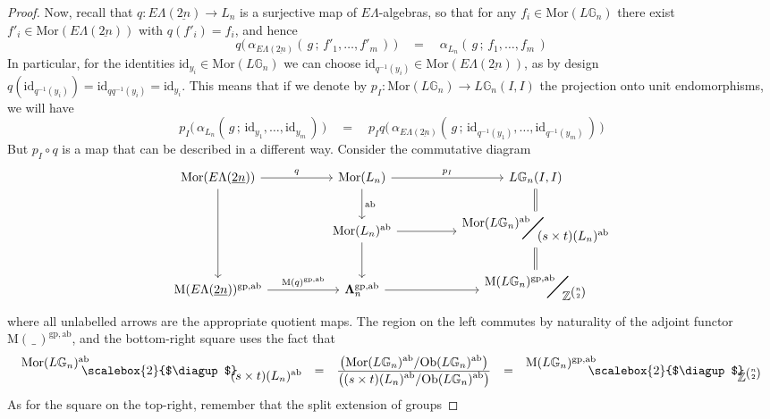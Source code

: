 \documentclass{amsbook} %
\newcommand{\id}{\textrm{id}}
\newcommand{\MLn}{\mathbf{\Lambda}_n}
\newcommand{\MorLn}{\mathrm{Mor}(L_n)}
\newcommand{\bigquotient}[2]{ \raisebox{0.75\height}{$#1$} \mkern-12mu\scalebox{2}{$\diagup$}\mkern-10mu \raisebox{-0.5\height}{$#2$} }
\newcommand{\ELnn}{E\Lambda(\underline{2n})}
\numberwithin{section}{chapter}
\begin{document}
\begin{proof}
Now, recall that $q \colon  \ELnn \to L_n$ is a surjective map of $E\Lambda$-algebras, so that for any $f_i \in \mathrm{Mor}(L\mathbb{G}_{n})$ there exist $f'_i \in \mathrm{Mor}(\ELnn)$ with $q(f'_i) = f_i$, and hence
\[ q\big( \, \alpha_{\ELnn}( \, g \, ; \, f'_1, \ldots, f'_m \, ) \, \big) \quad = \quad \alpha_{L_n}( \, g \, ; \, f_1, \ldots, f_m \, ) \]
In particular, for the identities $\id_{y_i} \in \mathrm{Mor}(L\mathbb{G}_{n})$ we can choose $\id_{q^{-1}(y_i)} \in \mathrm{Mor}(\ELnn)$, as by design $q(\id_{q^{-1}(y_i)}) = \id_{qq^{-1}(y_i)} = \id_{y_i}$. This means that if we denote by $p_I \colon  \mathrm{Mor}(L\mathbb{G}_{n}) \to L\mathbb{G}_{n}(I,I)$ the projection onto unit endomorphisms, we will have
\[ p_I \big( \, \alpha_{L_n}( \, g \, ; \, \id_{y_1}, \ldots, \id_{y_m} \, ) \, \big) \quad = \quad  p_I q\big( \, \alpha_{\ELnn}( \, g \, ; \, \id_{q^{-1}(y_1)}, \ldots, \id_{q^{-1}(y_m)} \, ) \, \big) \]
But $p_I \circ q$ is a map that can be described in a different way. Consider the commutative diagram
\[ \begin{tikzcd}
\mathrm{Mor}(\ELnn) \ar[rr, "q"] \ar[dd] & & \MorLn \ar[d, "\mathrm{ab}"] \ar[rr, "p_I"] & &  L\mathbb{G}_{n}(I,I) \ar[d, equals] \\
& & \MorLn^{\mathrm{ab}} \ar[d] \ar[rr] & & \bigquotient{\mathrm{Mor}(L\mathbb{G}_{n})^{\mathrm{ab}}}{(s \times t)(L_n)^{\mathrm{ab}}} \ar[d, equals] \\
\mathrm{M}(\ELnn)^{\mathrm{gp},\mathrm{ab}} \ar[rr, "\mathrm{M}(q)^{\mathrm{gp},\mathrm{ab}}"] & & \MLn^{\mathrm{gp},\mathrm{ab}} \ar[rr] & & \bigquotient{\mathrm{M}(L\mathbb{G}_{n})^{\mathrm{gp}, \mathrm{ab}}}{\mathbb{Z}^{{n}\choose{2}}}
\end{tikzcd} \]
where all unlabelled arrows are the appropriate quotient maps. The region on the left commutes by naturality of the adjoint functor $\mathrm{M}(\, \_ \,)^{\mathrm{gp},\mathrm{ab}}$, and the bottom-right square uses the fact that
\[ \begin{array}{rllll}
			\bigquotient{\mathrm{Mor}(L\mathbb{G}_{n})^{\mathrm{ab}}}{(s \times t)(L_n)^{\mathrm{ab}}} & = & \frac{ \displaystyle  \left(\mathrm{Mor}(L\mathbb{G}_{n})^{\mathrm{ab}}/\mathrm{Ob}(L\mathbb{G}_{n})^{\mathrm{ab}} \right)}{ \displaystyle \left( (s \times t)(L_n)^{\mathrm{ab}}/\mathrm{Ob}(L\mathbb{G}_{n})^{\mathrm{ab}} \right)} & = & \bigquotient{\mathrm{M}(L\mathbb{G}_{n})^{\mathrm{gp}, \mathrm{ab}}}{\mathbb{Z}^{{n}\choose{2}}}
		\end{array}
\]
As for the square on the top-right, remember that the split extension of groups

\end{proof}
\end{document}
